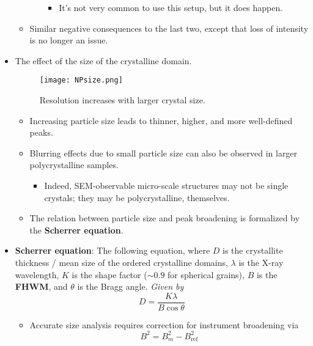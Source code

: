 \documentclass[../notes.tex]{subfiles}
\begin{document}
\begin{itemize}
\begin{itemize}
\begin{itemize}
            \begin{itemize}
                \item It's not very common to use this setup, but it does happen.
            \end{itemize}
        \end{itemize}
        \item Similar negative consequences to the last two, except that loss of intensity is no longer an issue.
    \end{itemize}
    \item The effect of the size of the crystalline domain.
    \begin{figure}[h!]
        \centering
        \texttt{[image: NPsize.png]}
        \caption{Resolution increases with larger crystal size.}
        \label{fig:NPsize}
    \end{figure}
    \begin{itemize}
        \item Increasing particle size leads to thinner, higher, and more well-defined peaks.
        \item Blurring effects due to small particle size can also be observed in larger polycrystalline samples.
        \begin{itemize}
            \item Indeed, SEM-observable micro-scale structures may not be single crystals; they may be polycrystalline, themselves.
        \end{itemize}
        \item The relation between particle size and peak broadening is formalized by the \textbf{Scherrer equation}.
    \end{itemize}
    \item \textbf{Scherrer equation}: The following equation, where $D$ is the crystallite thickness / mean size of the ordered crystalline domains, $\lambda$ is the X-ray wavelength, $K$ is the shape factor ($\sim 0.9$ for spherical grains), $B$ is the \textbf{FHWM}, and $\theta$ is the Bragg angle. \emph{Given by}
    \begin{equation*}
        D = \frac{K\lambda}{B\cos\theta}
    \end{equation*}
    \begin{itemize}
        \item Accurate size analysis requires correction for instrument broadening via
        \begin{equation*}
            B^2 = B_m^2-B_\text{ref}^2
        \end{equation*}

\end{itemize}
\end{itemize}
\end{document}
